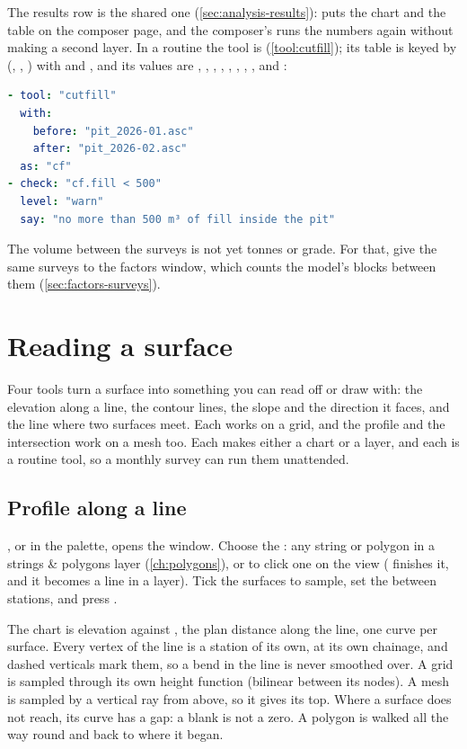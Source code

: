 The results row is the shared one (\cref{sec:analysis-results}):  puts the chart and the table on the composer page, and the composer's  runs the numbers again without making a second layer. In a routine the tool is  (\cref{tool:cutfill}); its table is keyed by  (, , ) with  and , and its values are , , , , , , , ,  and :

\begin{lstlisting}[language=yaml]
- tool: "cutfill"
  with:
    before: "pit_2026-01.asc"
    after: "pit_2026-02.asc"
  as: "cf"
- check: "cf.fill < 500"
  level: "warn"
  say: "no more than 500 m³ of fill inside the pit"
\end{lstlisting}

The volume between the surveys is not yet tonnes or grade. For that, give the same surveys to the factors window, which counts the model's blocks between them (\cref{sec:factors-surveys}).

\section{Reading a surface}\label{sec:grids-reading}
Four tools turn a surface into something you can read off or draw with: the elevation along a line, the contour lines, the slope and the direction it faces, and the line where two surfaces meet. Each works on a grid, and the profile and the intersection work on a mesh too. Each makes either a chart or a layer, and each is a routine tool, so a monthly survey can run them unattended.

\subsection{Profile along a line}\label{sec:grids-profile}
, or  in the palette, opens the  window. Choose the : any string or polygon in a strings \& polygons layer (\cref{ch:polygons}), or  to click one on the view ( finishes it, and it becomes a line in a  layer). Tick the surfaces to sample, set the  between stations, and press .

The chart is elevation against , the plan distance along the line, one curve per surface. Every vertex of the line is a station of its own, at its own chainage, and dashed verticals mark them, so a bend in the line is never smoothed over. A grid is sampled through its own height function (bilinear between its nodes). A mesh is sampled by a vertical ray from above, so it gives its top. Where a surface does not reach, its curve has a gap: a blank is not a zero. A polygon is walked all the way round and back to where it began.

